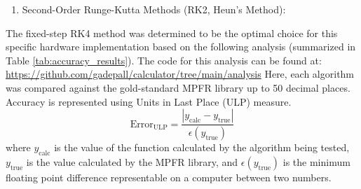 \documentclass[conference]{IEEEtran}
\begin{document}
\begin{enumerate}
\item {Second-Order Runge-Kutta Methods (RK2, Heun's Method):}

\end{enumerate}
The fixed-step RK4 method was determined to be the optimal choice for this specific hardware implementation based on the following analysis (summarized in Table \ref{tab:accuracy_results}). The code for this analysis can be found at: \url{https://github.com/gadepall/calculator/tree/main/analysis}
Here, each algorithm was compared against the gold-standard MPFR library up to 50 decimal places. Accuracy is represented using Units in Last Place (ULP) measure.
\label{app:codes}
\begin{equation}
  \text{Error}_\text{ULP} = \frac{|y_\text{calc}-y_\text{true}|}{\epsilon\left(y_\text{true}\right)}
\end{equation}
where $y_\text{calc}$ is the value of the function calculated by the algorithm being tested, $y_\text{true}$ is the value calculated by the MPFR library, and $\epsilon\left(y_\text{true}\right)$ is the minimum floating point difference representable on a computer between two numbers.
\end{document}
